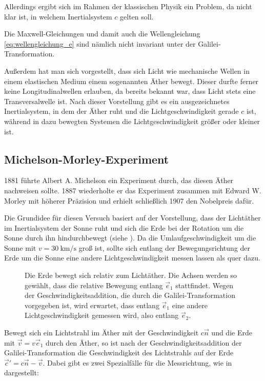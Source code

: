 Allerdings ergibt sich im Rahmen der klassischen Physik ein Problem, da nicht klar ist, in welchem Inertialsystem $c$ gelten soll.

Die Maxwell-Gleichungen und damit auch die Wellengleichung \eqref{eq:wellengleichung_e} sind nämlich nicht invariant unter der Galilei-Transformation.

Außerdem hat man sich vorgestellt, dass sich Licht wie mechanische Wellen in einem elastischen Medium \textendash{} einem sogenannten Äther \textendash{} bewegt. Dieser durfte ferner keine Longitudinalwellen erlauben, da bereits bekannt war, dass Licht stets eine Transversalwelle ist.
Nach dieser Vorstellung gibt es ein ausgezeichnetes Inertialsystem, in dem der Äther ruht und die Lichtgeschwindigkeit gerade $c$ ist, während in dazu bewegten Systemen die Lichtgeschwindigkeit größer oder kleiner ist.




\subsection{Michelson-Morley-Experiment}

1881 führte Albert A. Michelson ein Experiment durch, das diesen Äther nachweisen sollte. 1887 wiederholte er das Experiment zusammen mit Edward W. Morley mit höherer Präzision und erhielt schließlich 1907 den Nobelpreis dafür.

Die Grundidee für diesen Versuch basiert auf der Vorstellung, dass der Lichtäther im Inertialsystem der Sonne ruht und sich die Erde bei der Rotation um die Sonne durch ihn hindurchbewegt (siehe ). Da die Umlaufgeschwindigkeit um die Sonne mit $v=\SI{30}{\kilo\m\per\s}$ groß ist, sollte sich entlang der Bewegungsrichtung der Erde um die Sonne eine andere Lichtgeschwindigkeit messen lassen als quer dazu.

\begin{figure}[htp]
    \centering
    \tfigEarthMovingThroughLightEther
    \caption{Die Erde bewegt sich relativ zum Lichtäther. Die Achsen werden so gewählt, dass die relative Bewegung entlang $\vec e_1$ stattfindet. Wegen der Geschwindigkeitsaddition, die durch die Galilei-Transformation vorgegeben ist, wird erwartet, dass entlang $\vec e_1$ eine andere Lichtgeschwindigkeit gemessen wird, also entlang $\vec e_2$. }
    \label{fig:bewegung_durch_lichtaetherA}
\end{figure}

Bewegt sich ein Lichtstrahl im Äther mit der Geschwindigkeit $c\vec n$ und die Erde mit $\vec v = v\vec e_1$ durch den Äther, so ist nach der Geschwindigkeitsaddition der Galilei-Transformation die Geschwindigkeit des Lichtstrahls auf der Erde $\vec c'=c\vec n-\vec v$. Dabei gibt es zwei Spezialfälle für die Messrichtung, wie in  dargestellt:

